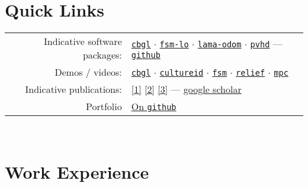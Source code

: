 \documentclass[a4paper,10pt,twoside]{article}
\begin{document}
\section*{Quick Links}

\begin{tabular}{rp{12cm}}

Indicative software packages: &
\href{https://github.com/li9i/cbgl}{\texttt{cbgl}} $\cdot$
\href{https://github.com/li9i/fsm-lo}{\texttt{fsm-lo}} $\cdot$
\href{https://github.com/li9i/lama-odom}{\texttt{lama-odom}} $\cdot$
\href{https://github.com/li9i/pandora\_vision\_2014/tree/hydro-devel/pandora\_vision\_hole\_detector}{\texttt{pvhd}} ---  \href{https://github.com/li9i}{\texttt{github}} \\


Demos / videos: &
\href{https://www.youtube.com/watch?v=xaDKjI0WkDc}{\texttt{cbgl}} $\cdot$ \href{https://cultureid.web.auth.gr/?page\_id=200&lang=en}{\texttt{cultureid}} $\cdot$ \href{https://www.youtube.com/watch?v=hB4qsHCEXGI}{\texttt{fsm}} $\cdot$ \href{https://relief.web.auth.gr/}{\texttt{relief}} $\cdot$ \href{https://www.youtube.com/watch?v=937OZez1iN8}{\texttt{mpc}}\\

Indicative publications: &
\href{https://ieeexplore.ieee.org/abstract/document/9981228}{[1]}
\href{https://www.sciencedirect.com/science/article/abs/pii/S0921889021002323}{[2]}
\href{https://www.tandfonline.com/doi/full/10.1080/00207179.2018.1514129}{[3]} --- \href{https://scholar.google.com/citations?view\_op=list\_works\&hl=en\&user=9\_hI4hMAAAAJ}{google scholar}\\

  Portfolio & \href{https://docs.google.com/viewer?url=https://raw.githubusercontent.com/li9i/portfolio/master/portfolio.pdf}{On \texttt{github}}
\end{tabular}
\\

\vfill
\tableofcontents
\newpage

\vspace*{\fill}

\section{Work Experience}
\end{document}
